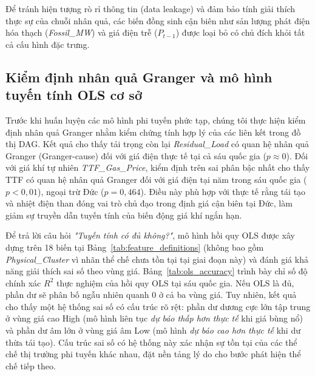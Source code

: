 Để tránh hiện tượng rò rỉ thông tin (data leakage) và đảm bảo tính giải thích thực sự của chuỗi nhân quả, các biến đồng sinh cận biên như sản lượng phát điện hóa thạch (\textit{Fossil\_MW}) và giá điện trễ ($P_{t-1}$) được loại bỏ có chủ đích khỏi tất cả cấu hình đặc trưng.

\subsection{Kiểm định nhân quả Granger và mô hình tuyến tính OLS cơ sở}

Trước khi huấn luyện các mô hình phi tuyến phức tạp, chúng tôi thực hiện kiểm định nhân quả Granger nhằm kiểm chứng tính hợp lý của các liên kết trong đồ thị DAG. Kết quả cho thấy tải trọng còn lại \textit{Residual\_Load} có quan hệ nhân quả Granger (Granger-cause) đối với giá điện thực tế tại cả sáu quốc gia ($p \approx 0$). Đối với giá khí tự nhiên \textit{TTF\_Gas\_Price}, kiểm định trên sai phân bậc nhất cho thấy TTF có quan hệ nhân quả Granger đối với giá điện tại năm trong sáu quốc gia ($p < 0,01$), ngoại trừ Đức ($p = 0,464$). Điều này phù hợp với thực tế rằng tái tạo và nhiệt điện than đóng vai trò chủ đạo trong định giá cận biên tại Đức, làm giảm sự truyền dẫn tuyến tính của biến động giá khí ngắn hạn.

Để trả lời câu hỏi \textit{"Tuyến tính có đủ không?"}, mô hình hồi quy OLS được xây dựng trên 18 biến tại Bảng~\ref{tab:feature_definitions} (không bao gồm \textit{Physical\_Cluster} vì nhãn thể chế chưa tồn tại tại giai đoạn này) và đánh giá khả năng giải thích sai số theo vùng giá. Bảng~\ref{tab:ols_accuracy} trình bày chỉ số độ chính xác $R^2$ thực nghiệm của hồi quy OLS tại sáu quốc gia. Nếu OLS là đủ, phần dư sẽ phân bố ngẫu nhiên quanh 0 ở cả ba vùng giá. Tuy nhiên, kết quả cho thấy một hệ thống sai số có cấu trúc rõ rệt: phần dư dương cực lớn tập trung ở vùng giá cao High (mô hình liên tục \textit{dự báo thấp hơn thực tế} khi giá bùng nổ) và phần dư âm lớn ở vùng giá âm Low (mô hình \textit{dự báo cao hơn thực tế} khi dư thừa tái tạo). Cấu trúc sai số có hệ thống này xác nhận sự tồn tại của các thể chế thị trường phi tuyến khác nhau, đặt nền tảng lý do cho bước phát hiện thể chế tiếp theo.

